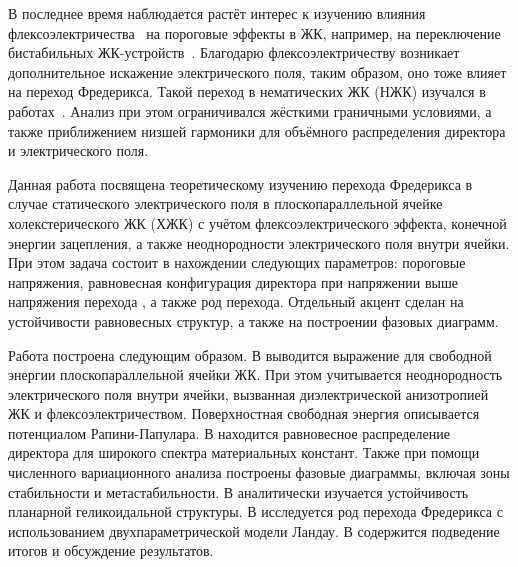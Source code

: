 В последнее время наблюдается растёт интерес к изучению влияния флексоэлектричества~\autocite{buka2012flexoelectricity} на пороговые эффекты в ЖК, например, на переключение бистабильных ЖК-устройств~\autocite{Davidson2002,  Parry-Jones2009, Cummings2013}.
Благодарю флексоэлектричеству возникает дополнительное искажение электрического поля, таким образом, оно тоже влияет на переход Фредерикса.
Такой переход в нематических ЖК (НЖК) изучался в работах~\autocite{Brown2003,Brown2007,Mema2017}.
Анализ при этом ограничивался жёсткими граничными условиями, а также приближением низшей гармоники для объёмного распределения директора и электрического поля.

Данная работа посвящена теоретическому изучению перехода Фредерикса в случае статического электрического поля в плоскопараллельной ячейке холекстерического ЖК (ХЖК) с учётом флексоэлектрического эффекта, конечной энергии зацепления, а также неоднородности электрического поля внутри ячейки.
При этом задача состоит в нахождении следующих параметров: пороговые напряжения, равновесная конфигурация директора при напряжении выше напряжения перехода , а также род перехода.
Отдельный акцент сделан на устойчивости равновесных структур, а также на построении фазовых диаграмм.

Работа построена следующим образом. В  выводится выражение для свободной энергии плоскопараллельной ячейки ЖК.
При этом учитывается неоднородность электрического поля внутри ячейки, вызванная диэлектрической анизотропией ЖК и флексоэлектричеством.
Поверхностная свободная энергия описывается потенциалом Рапини-Папулара.
В  находится равновесное распределение директора для широкого спектра материальных констант.
Также при помощи численного вариационного анализа построены фазовые диаграммы, включая зоны стабильности и метастабильности.
В  аналитически изучается устойчивость планарной геликоидальной структуры.
В  исследуется род перехода Фредерикса с использованием двухпараметрической модели Ландау.
В  содержится подведение итогов и обсуждение результатов.
\fi
